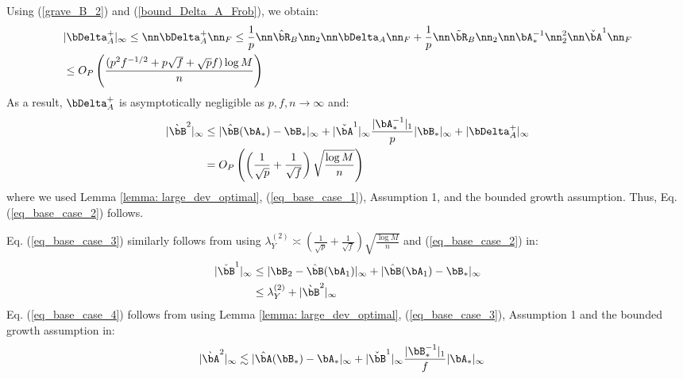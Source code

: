 \begin{IEEEproof}
Using (\ref{grave_B_2}) and (\ref{bound_Delta_A_Frob}), we obtain:
\begin{align}
	& |\bDelta_A^+|_\infty\leq  \nn \bDelta_A^+ \nn_F \leq \frac{1}{p} \nn \hat{\bR}_B \nn_2 \nn \bDelta_A \nn_F + \frac{1}{p} \nn \tilde{\bR}_B\nn_2 \nn \bA_*^{-1}\nn_2^2 \nn \check{\bA}^1 \nn_F \nonumber \\
	 &\leq O_P\left( \frac{(p^2 f^{-1/2}+p\sqrt{f}+\sqrt{p}f) \log M}{n} \right) \label{weaker_sufficient_condition}
\end{align}
As a result, $\bDelta_A^+$ is asymptotically negligible as $p,f,n\to\infty$ and:
\begin{align}
	|\grave{\bB}^2|_\infty %
		&\leq |\hat{\bB}(\bA_*)-\bB_*|_\infty + |\check{\bA}^1|_\infty \frac{|\bA_*^{-1}|_1}{p} |\bB_*|_\infty + |\bDelta_A^+|_\infty \nonumber \\
		&= O_P\left( \left( \frac{1}{\sqrt{p}} + \frac{1}{\sqrt{f}} \right) \sqrt{\frac{\log M}{n}} \right) \label{grave_B_2_bound_linfty}
\end{align}
where we used Lemma \ref{lemma: large_dev_optimal}, (\ref{eq_base_case_1}), Assumption 1, and the bounded growth assumption. Thus, Eq. (\ref{eq_base_case_2}) follows.

Eq. (\ref{eq_base_case_3}) similarly follows from using $\lambda_Y^{(2)}\asymp (\frac{1}{\sqrt{p}}+\frac{1}{\sqrt{f}}) \sqrt{\frac{\log M}{n}} $ and (\ref{eq_base_case_2}) in:
\begin{align*}
	|\check{\bB}^1|_\infty &\leq |\bB_2 - \hat{\bB}(\bA_1)|_\infty + |\hat{\bB}(\bA_1)-\bB_*|_\infty \\
		&\leq \lambda_Y^{(2)} + |\grave{\bB}^2|_\infty
\end{align*}
Eq. (\ref{eq_base_case_4}) follows from using Lemma \ref{lemma: large_dev_optimal}, (\ref{eq_base_case_3}), Assumption 1 and the bounded growth assumption in:
\begin{align*}
	|\grave{\bA}^2|_\infty &\lesssim |\hat{\bA}(\bB_*)-\bA_*|_\infty + |\check{\bB}^1|_\infty \frac{|\bB_*^{-1}|_1}{f} |\bA_*|_\infty
\end{align*}


\end{IEEEproof}
